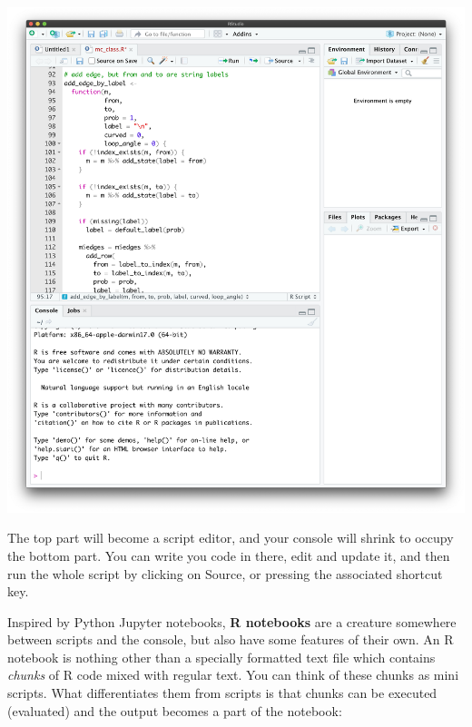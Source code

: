 \documentclass[
]{book}
\theoremstyle{definition}
\theoremstyle{definition}
\theoremstyle{definition}
\theoremstyle{definition}
\theoremstyle{remark}
\begin{document}
\begin{center}\includegraphics[width=1\linewidth,style="padding:10px"]{pics/script_console} \end{center}

The top part will become a script editor, and your console will shrink to occupy the bottom part. You can write you code in there, edit and update it, and then run the whole script by clicking on Source, or pressing the associated shortcut key.

Inspired by Python Jupyter notebooks, \textbf{R notebooks} are a creature somewhere between scripts and the console, but also have some features of their own.
An R notebook is nothing other than a specially formatted text file which contains \emph{chunks} of R code mixed with regular text. You can think of these chunks as mini scripts. What differentiates them from scripts is that chunks can be executed (evaluated) and the output becomes a part of the notebook:
\end{document}
